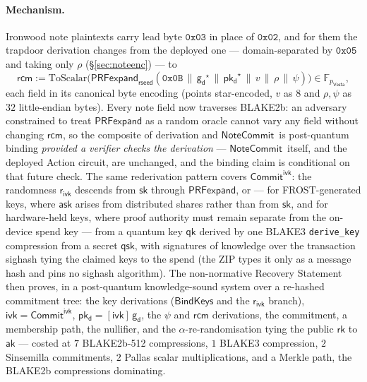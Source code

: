 \documentclass[11pt,a4paper]{article}
\theoremstyle{definition}
\newcommand{\F}{\mathbb{F}}
\newcommand{\rk}{\mathsf{rk}}
\newcommand{\Vesta}{\ensuremath{\mathsf{Vesta}}}
\newcommand{\NoteCommit}{\ensuremath{\mathsf{NoteCommit}}}
\newcommand{\CommitIvk}{\ensuremath{\mathsf{Commit}^{\mathsf{ivk}}}}
\newcommand{\ask}{\ensuremath{\mathsf{ask}}}
\newcommand{\aksym}{\ensuremath{\mathsf{ak}}}
\newcommand{\ivk}{\ensuremath{\mathsf{ivk}}}
\newcommand{\pkd}{\ensuremath{\mathsf{pk_d}}}
\newcommand{\gd}{\ensuremath{\mathsf{g_d}}}
\newcommand{\rcm}{\ensuremath{\mathsf{rcm}}}
\newcommand{\rivk}{\ensuremath{\mathsf{r_{ivk}}}}
\begin{document}
\paragraph{Mechanism.} Ironwood note plaintexts carry lead byte
$\mathtt{0x03}$ in place of $\mathtt{0x02}$, and for them the trapdoor
derivation changes from the deployed one --- domain-separated by
$\mathtt{0x05}$ and
taking only $\rho$ (\S\ref{sec:noteenc}) --- to
\[
\rcm := \mathrm{ToScalar}\bigl(\mathsf{PRFexpand}_{\mathsf{rseed}}(
\mathtt{0x0B} \,\|\, \gd^\star \,\|\, \pkd^\star \,\|\, v \,\|\, \rho \,\|\,
\psi)\bigr) \in \F_{p_{\Vesta}},
\]
each field in its canonical byte encoding (points star-encoded, $v$ as $8$ and
$\rho, \psi$ as $32$ little-endian bytes). Every note field now traverses
BLAKE2b: an adversary constrained to treat $\mathsf{PRFexpand}$ as a random
oracle cannot vary any field without changing $\rcm$, so the composite of
derivation and \NoteCommit\ is post-quantum binding \emph{provided a verifier
checks the derivation} --- \NoteCommit\ itself, and the deployed Action
circuit, are unchanged, and the binding claim is conditional on that future
check. The same rederivation pattern covers \CommitIvk: the randomness
$\rivk$ descends from $\mathsf{sk}$ through $\mathsf{PRFexpand}$, or --- for
FROST-generated keys, where $\ask$ arises from distributed shares rather than
from $\mathsf{sk}$, and for hardware-held keys, where proof authority must
remain separate from the on-device spend key --- from a quantum key
$\mathsf{qk}$ derived by one BLAKE3
\texttt{derive\_key} compression from a secret $\mathsf{qsk}$, with signatures
of knowledge over the transaction sighash tying the claimed keys to the spend
(the ZIP types it only as a message hash and pins no sighash algorithm). The
non-normative Recovery Statement then proves, in a post-quantum
knowledge-sound system over a re-hashed commitment tree: the key derivations
($\mathsf{BindKeys}$ and the $\rivk$ branch), $\ivk = \CommitIvk$,
$\pkd = [\ivk]\,\gd$, the $\psi$ and $\rcm$ derivations, the commitment, a
membership path, the nullifier, and the $\alpha$-re-randomisation tying the
public $\rk$ to $\aksym$ --- costed at $7$ BLAKE2b-512 compressions,
$1$ BLAKE3 compression, $2$ Sinsemilla commitments, $2$ Pallas scalar
multiplications, and a Merkle path, the BLAKE2b compressions dominating.
\end{document}
